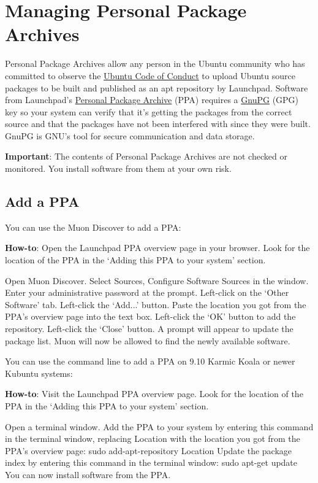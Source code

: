 \documentclass[letterpaper,10pt,english]{sphinxmanual}
\begin{document}
\section{Managing Personal Package Archives}
\label{docs/repositories:managing-personal-package-archives}
Personal Package Archives allow any person in the Ubuntu community who has committed to observe the \href{https://launchpad.net/codeofconduct}{Ubuntu Code of Conduct} to upload Ubuntu source packages to be built and published as an apt repository by Launchpad. Software from Launchpad's \href{https://launchpad.net/ubuntu/+ppas}{Personal Package Archive} (PPA) requires a \href{https://www.gnupg.org/}{GnuPG} (GPG) key so your system can verify that it's getting the packages from the correct source and that the packages have not been interfered with since they were built. GnuPG is GNU's tool for secure communication and data storage.

\textbf{Important}: The contents of Personal Package Archives are not checked or monitored. You install software from them at your own risk.


\subsection{Add a PPA}
\label{docs/repositories:add-a-ppa}
You can use the Muon Discover to add a PPA:

\textbf{How-to}: Open the Launchpad PPA overview page in your browser. Look for the location of the PPA in the `Adding this PPA to your system' section.

Open Muon Discover. Select Sources, Configure Software Sources in the window. Enter your administrative password at the prompt. Left-click on the `Other Software' tab. Left-click the `Add...' button. Paste the location you got from the PPA's overview page into the text box. Left-click the `OK' button to add the repository. Left-click the `Close' button. A prompt will appear to update the package list. Muon will now be allowed to find the newly available software.

You can use the command line to add a PPA on 9.10 Karmic Koala or newer Kubuntu systems:

\textbf{How-to}: Visit the Launchpad PPA overview page. Look for the location of the PPA in the `Adding this PPA to your system' section.

Open a terminal window. Add the PPA to your system by entering this command in the terminal window, replacing Location with the location you got from the PPA's overview page: sudo add-apt-repository Location Update the package index by entering this command in the terminal window: sudo apt-get update You can now install software from the PPA.
\end{document}
